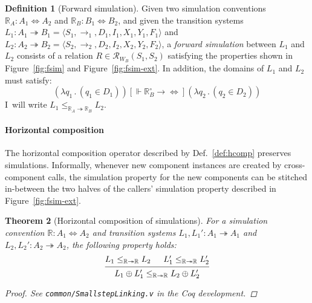 \documentclass[11pt,oneside]{book}
\newtheorem{theorem}{Theorem}[chapter]
\theoremstyle{definition}
\newtheorem{definition}[theorem]{Definition}
\newcommand{\ifr}[1]{\mathrel{[{#1}]}}
\newcommand{\que}{\circ}         %
\begin{document}
\begin{definition}[Forward simulation] \label{def:fsim} %
Given
two simulation conventions
$\mathbb{R}_A : A_1 \Leftrightarrow A_2$ and
$\mathbb{R}_B : B_1 \Leftrightarrow B_2$,
and given
the transition systems
$L_1 : A_1 \twoheadrightarrow B_1 = \langle S_1, {\rightarrow}_1, D_1, I_1, X_1, Y_1, F_1 \rangle$ and
$L_2 : A_2 \twoheadrightarrow B_2 = \langle S_2, {\rightarrow}_2, D_2, I_2, X_2, Y_2, F_2 \rangle$,
a \emph{forward simulation} between $L_1$ and $L_2$
consists of a relation
$R \in \mathcal{R}_{W_B}(S_1, S_2)$
satisfying the properties shown in
Figure~\ref{fig:fsim} and Figure~\ref{fig:fsim-ext}.
In addition, the domains of $L_1$ and $L_2$
must satisfy:
\[
  (\lambda q_1 \, . \, (q_1 \in D_1))
  \ifr{\Vdash \mathbb{R}_B^\que \rightarrow {\Leftrightarrow}}
  (\lambda q_2 \, . \, (q_2 \in D_2))
\]
I~will write $L_1 \le_{\mathbb{R}_A \twoheadrightarrow \mathbb{R}_B} L_2$.
\end{definition}


\paragraph{Horizontal composition} %

The horizontal composition operator
described by Def.~\ref{def:hcomp}
preserves simulations.
Informally,
whenever new component instances are created
by cross-component calls,
the simulation property for the new components
can be stitched in-between
the two halves of the callers' simulation property
described in Figure~\ref{fig:fsim-ext}.

\begin{theorem}[Horizontal composition of simulations] \label{thm:fsim-hcomp} %
For a simulation convention
$\mathbb{R} : A_1 \Leftrightarrow A_2$
and transition systems
$L_1, L_1' : A_1 \twoheadrightarrow A_1$ and
$L_2, L_2' : A_2 \twoheadrightarrow A_2$,
the following property holds:
\[
  \begin{prooftree}
    \hypo{L_1 \le_{\mathbb{R} \twoheadrightarrow \mathbb{R}} L_2}
    \hypo{L_1' \le_{\mathbb{R} \twoheadrightarrow \mathbb{R}} L_2'}
    \infer2{L_1 \oplus L_1'
      \le_{\mathbb{R} \twoheadrightarrow \mathbb{R}}
      L_2 \oplus L_2'}
  \end{prooftree}
\]
\begin{proof}
See \texttt{common/SmallstepLinking.v}
in the Coq development.
\end{proof}
\end{theorem}
\end{document}
